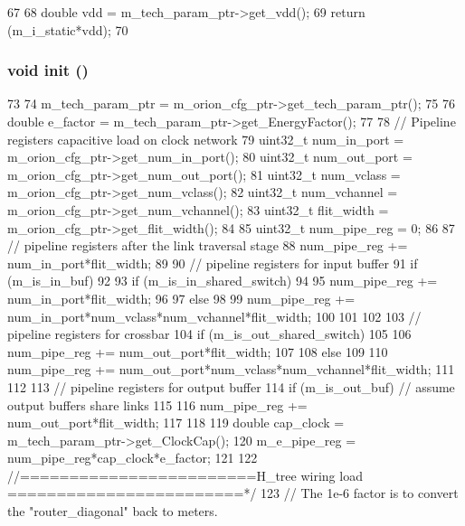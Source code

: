 \begin{DoxyCode}
67 {
68     double vdd = m_tech_param_ptr->get_vdd();
69     return (m_i_static*vdd);
70 }
\end{DoxyCode}
\hypertarget{classClock_a02fd73d861ef2e4aabb38c0c9ff82947}{
\subsubsection[{init}]{\setlength{\rightskip}{0pt plus 5cm}void init ()}}
\label{classClock_a02fd73d861ef2e4aabb38c0c9ff82947}



\begin{DoxyCode}
73 {
74     m_tech_param_ptr = m_orion_cfg_ptr->get_tech_param_ptr();
75 
76     double e_factor = m_tech_param_ptr->get_EnergyFactor();
77 
78     // Pipeline registers capacitive load on clock network
79     uint32_t num_in_port = m_orion_cfg_ptr->get_num_in_port();
80     uint32_t num_out_port = m_orion_cfg_ptr->get_num_out_port();
81     uint32_t num_vclass = m_orion_cfg_ptr->get_num_vclass();
82     uint32_t num_vchannel = m_orion_cfg_ptr->get_num_vchannel();
83     uint32_t flit_width = m_orion_cfg_ptr->get_flit_width();
84 
85     uint32_t num_pipe_reg = 0;
86 
87     // pipeline registers after the link traversal stage
88     num_pipe_reg += num_in_port*flit_width;
89 
90     // pipeline registers for input buffer
91     if (m_is_in_buf)
92     {
93         if (m_is_in_shared_switch)
94         {
95             num_pipe_reg += num_in_port*flit_width;
96         }
97         else
98         {
99             num_pipe_reg += num_in_port*num_vclass*num_vchannel*flit_width;
100         }
101     }
102 
103     // pipeline registers for crossbar
104     if (m_is_out_shared_switch)
105     {
106         num_pipe_reg += num_out_port*flit_width;
107     }
108     else
109     {
110         num_pipe_reg += num_out_port*num_vclass*num_vchannel*flit_width;
111     }
112 
113     // pipeline registers for output buffer
114     if (m_is_out_buf) // assume output buffers share links
115     {
116         num_pipe_reg += num_out_port*flit_width;
117     }
118 
119     double cap_clock = m_tech_param_ptr->get_ClockCap();
120     m_e_pipe_reg = num_pipe_reg*cap_clock*e_factor;
121 
122     //========================H_tree wiring load ========================*/
123     // The 1e-6 factor is to convert the "router_diagonal" back to meters.
}
\end{DoxyCode}
